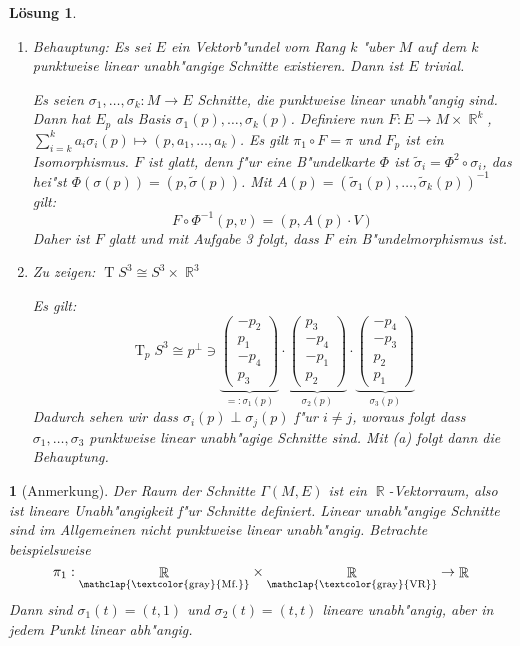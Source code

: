 \documentclass[paper=A4, twoside, chapterprefix=true, bibliography=totoc, headsepline]{scrbook}
\DeclareMathOperator{\R}{\mathbb{R}}
\DeclareMathOperator{\T}{T} %
\newcommand{\X}{\times}
\theoremstyle{plain}
\theoremstyle{nonumberplain}
\theoremstyle{empty}
\newtheorem{emptythm}{}%
\theoremstyle{break}
\newtheorem{Loes}{L\"osung}
\begin{document}
\begin{Loes}\begin{enumerate}[label=(\alph*),leftmargin=*,widest=a]
\item
	\emph{Behauptung:} Es sei $E$ ein Vektorb"undel vom Rang $k$ "uber $M$ auf dem $k$ punktweise linear unabh"angige Schnitte existieren. Dann ist $E$ trivial.
	
	Es seien $\sigma_1, \ldots, \sigma_k: M \to E$ Schnitte, die punktweise linear unabh"angig sind. Dann hat $E_p$ als Basis $\sigma_1(p),\ldots ,\sigma_k(p)$. Definiere nun $F: E \to M \X \R^k$, $\sum_{i=k}^k a_i \sigma_i(p) \mapsto (p, a_1,\ldots ,a_k)$. Es gilt $\pi_1 \circ F = \pi$ und $F_p$ ist ein Isomorphismus. $F$ ist glatt, denn f"ur eine B"undelkarte $\Phi$ ist $\tilde \sigma_i = \Phi^2 \circ \sigma_i$, das hei"st $\Phi(\sigma(p)) = (p, \tilde\sigma(p))$. Mit $A(p) = (\tilde\sigma_1(p),\ldots ,\tilde\sigma_k(p))^{-1}$ gilt:
	\[ F \circ \Phi^{-1}(p,v) = (p, A(p) \cdot V) \]
Daher ist $F$ glatt und mit Aufgabe 3 folgt, dass $F$ ein B"undelmorphismus ist.
\item
	\emph{Zu zeigen:} $\T S^3 \cong S^3 \X \R^3$
	
	Es gilt:
		\[ \T_pS^3 \cong p^\perp \ni \underbrace{\begin{pmatrix} -p_2 \\ p_1 \\ -p_4 \\ p_3 \end{pmatrix}}_{=:\sigma_1(p)} \cdot \underbrace{\begin{pmatrix} p_3 \\ -p_4 \\ -p_1 \\ p_2 \end{pmatrix}}_{\sigma_2(p)} \cdot \underbrace{\begin{pmatrix} -p_4 \\ -p_3 \\ p_2 \\ p_1 \end{pmatrix}}_{\sigma_3(p)} \]
	Dadurch sehen wir dass $\sigma_i(p) \perp \sigma_j(p)$ f"ur $ i \ne j$, woraus folgt dass $\sigma_1, \ldots ,\sigma_3$ punktweise linear unabh"agige Schnitte sind. Mit (a) folgt dann die Behauptung.
\end{enumerate}\end{Loes}

\begin{emptythm}[Anmerkung]
Der Raum der Schnitte $\Gamma(M,E)$ ist ein $\R$-Vektorraum, also ist lineare Unabh"angigkeit f"ur Schnitte definiert. Linear unabh"angige Schnitte sind im Allgemeinen \emph{nicht} punktweise linear unabh"angig. Betrachte beispielsweise
	\[ \pi_1: \underset{\mathclap{\text{\textcolor{gray}{Mf.}}}}{\R} \X \underset{\mathclap{\text{\textcolor{gray}{VR}}}}{\R} \to \R \]
Dann sind $\sigma_1(t) = (t,1)$ und $\sigma_2(t) = (t,t)$ lineare unabh"angig, aber in jedem Punkt linear abh"angig.
\end{emptythm}
\end{document}
